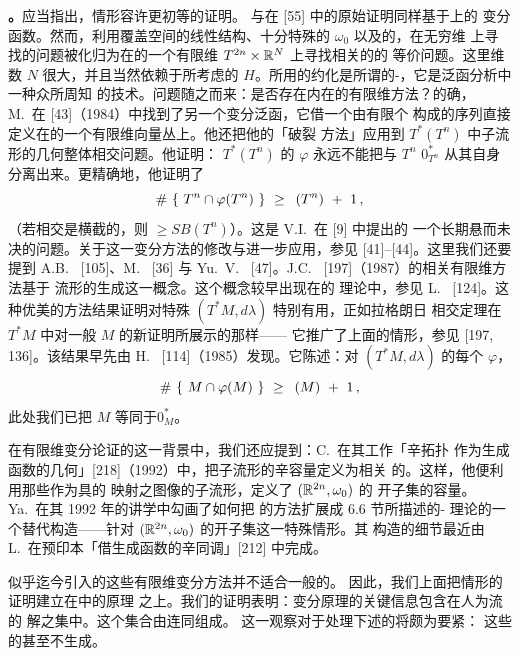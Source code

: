 \textbf{\trhRemark。}\quad 应当指出，\trTorus{}情形容许更初等的证明。%
\trConley{}与\trZehnder{}在 [55] 中的原始证明同样基于\trLoopSpace{}上的%
\trHamiltonian{}变分函数。然而，利用覆盖空间的线性结构、十分特殊的%
\trSymplecticStructure{} $\omega_{0}$ 以及\trTorus{}的\trCompactness，在无穷维%
\trLoopSpace{}上寻找\trCriticalPoint{}的问题被化归为在\trTorus{}的一个有限维%
\trBundle{} $T^{2n}\times\mathbb{R}^{N}$ 上寻找相关\trFunctional{}的\trCriticalPoint{}的%
等价问题。这里维数 $N$ 很大，并且当然依赖于所考虑的\trHamiltonianFunction{}%
$H$。所用的约化是所谓的\trLyapunov-\trSchmidt{}\trReduction，它是泛函分析中一种众所周知%
的技术。问题随之而来：是否存在内在的有限维方法？的确，M.~\trChaperon{}在%
[43]（1984）中找到了另一个变分泛函，它借一个由有限个\trGeneratingFunction{}%
构成的序列直接定义在\trTorus{}的一个有限维向量丛上。他还把他的「破裂\trGeodesic{}%
方法」应用到 $T^{*}(T^{n})$ 中\trLagrange{}子流形的几何整体相交问题。他证明：%
$T^{*}(T^{n})$ 的\trHamiltonianMap{} $\varphi$ 永远不能把与 $T^{n}$%
\trDiffeomorphic{}\trZeroSection{} $0^{*}_{T^{n}}$ 从其自身分离出来。更精确地，他证明了
\[
\#\ \{\ T^{n}\cap\varphi(T^{n})\ \}\ \geq\ \text{\trCupLength}\,(T^{n})\ +\ 1\,,
\]
（若相交是横截的，则 $\geq SB(T^{n})$）。这是 V.I.~\trArnold{}在 [9] 中提出的%
一个长期悬而未决的问题。关于这一变分方法的修改与进一步应用，参见%
[41]--[44]。这里我们还要提到 A.B.~\trGivental{} [105]、M.~\trBrunella{} [36] 与%
Yu.~V.~\trChekanov{} [47]。J.C.~\trSikorav{} [197]（1987）的相关有限维方法基于%
\trLagrange{}流形的生成\trPhaseFunction{}这一概念。这个概念较早出现在\trFourierIntegralOperator{}的%
理论中，参见 L.~\trHormander{} [124]。这种优美的方法结果证明对特殊%
\trSymplecticManifold{} $(T^{*}M,d\lambda)$ 特别有用，正如\trHofer{}拉格朗日%
相交定理在 $T^{*}M$ 中对一般\trCompact\trManifold{} $M$ 的新证明所展示的那样——%
它推广了上面的\trTorus{}情形，参见 [197, 136]。该结果早先由 H.~\trHofer{}%
[114]（1985）发现。它陈述：对 $(T^{*}M,d\lambda)$ 的每个\trHamiltonianMap{}%
$\varphi$，
\[
\#\ \{\ M\cap\varphi(M)\ \}\ \geq\ \text{\trCupLength}\,(M)\ +\ 1\,,
\]
此处我们已把 $M$ 等同于\trZeroSection $0^{*}_{M}$。

在有限维变分论证的这一背景中，我们还应提到：C.~\trViterbo{}在其工作「辛拓扑%
作为生成函数的几何」[218]（1992）中，把\trLagrange{}子流形的辛容量定义为相关%
\trPhaseFunction{}的\trCriticalValue。这样，他便利用那些作为具\trCompactSupport{}的%
\trHamiltonian{}映射之图像的\trLagrange{}子流形，定义了 $(\mathbb{R}^{2n},\omega_{0})$ 的%
开子集的容量。Ya.~\trEliashberg{}在其 1992 年的讲学中勾画了如何把%
\trViterbo{}的方法扩展成 6.6 节所描述的\trFloer-\trHofer\trSymplectic\trHomology{}%
理论的一个替代构造——针对 $(\mathbb{R}^{2n},\omega_{0})$ 的开子集这一特殊情形。其%
构造的细节最近由 L.~\trTraynor{}在预印本「借生成函数的辛同调」[212] 中完成。

似乎迄今引入的这些有限维变分方法并不适合一般的\trSymplecticManifold。%
因此，我们上面把\trTorus{}情形的证明建立在\trLoopSpace{}中的\trAction{}原理%
之上。我们的证明表明：变分原理的关键信息包含在人为\trGradient{}流的%
\trBounded{}解之集中。这个集合由\trRestPoint{}连同\trConnectingOrbit{}组成。%
这一观察对于\trFloer{}处理下述\trFunctional{}的\trMorseTheory{}将颇为要紧：%
这些\trFunctional{}的\trGradient{}甚至不生成\trFlow。
